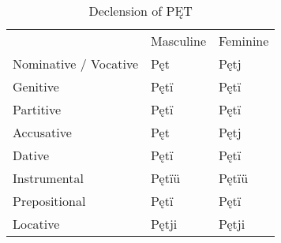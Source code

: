 \begin{table}[!htb]
	\caption{Declension of PĘT}
	\begin{tabular}{lll}
		& Masculine & Feminine \\
		Nominative / Vocative & Pęt & Pętj \\
		Genitive & Pętï & Pętï \\
		Partitive & Pętï & Pętï \\
		Accusative & Pęt & Pętj \\
		Dative & Pętï & Pętï \\
		Instrumental & Pętïü & Pętïü \\
		Prepositional & Pętï & Pętï \\
		Locative & Pętji & Pętji \\
	\end{tabular}
\end{table}